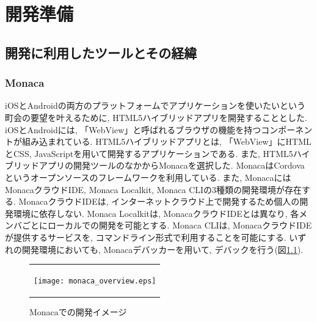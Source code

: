 \chapter{開発準備}

\section{開発に利用したツールとその経緯}%
\subsection{Monaca}%
iOSとAndroidの両方のプラットフォームでアプリケーションを使いたいという町会の要望を叶えるために, HTML5ハイブリッドアプリを開発することとした. iOSとAndroidには, 「WebView」と呼ばれるブラウザの機能を持つコンポーネントが組み込まれている\cite{book_about_monaca}. HTML5ハイブリッドアプリとは, 「WebView」にHTMLとCSS, JavaScriptを用いて開発するアプリケーションである\cite{book_about_monaca}. また, HTML5ハイブリッドアプリの開発ツールのなかからMonacaを選択した. MonacaはCordovaというオープンソースのフレームワークを利用している\cite{book_about_monaca}. また, MonacaにはMonacaクラウドIDE, Monaca Localkit, Monaca CLIの3種類の開発環境が存在する\cite{book_about_monaca}. MonacaクラウドIDEは, インターネットクラウド上で開発するため個人の開発環境に依存しない\cite{book_about_monaca}. Monaca Localkitは, MonacaクラウドIDEとは異なり, 各メンバごとにローカルでの開発を可能とする\cite{book_about_monaca}. Monaca CLIは, MonacaクラウドIDEが提供するサービスを, コマンドライン形式で利用することを可能にする\cite{book_about_monaca}. いずれの開発環境においても, Monacaデバッカーを用いて, デバックを行う(図\ref{fig:image_monaca}).

\begin{figure}[h]
  \begin{center}
    \begin{tabular}{c}

      \begin{minipage}{0.7\hsize}
        \begin{center}
\texttt{[image: monaca\_overview.eps]}
          \hspace{1cm} %
        \end{center}
      \end{minipage}

    \end{tabular}
    \caption{Monacaでの開発イメージ\cite{monaca_debugger}}
    \label{fig:image_monaca}
  \end{center}
\end{figure}

